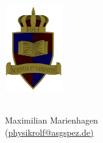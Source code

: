 \documentclass[a4paper, twocolumn]{article}
\title{
\centering\raisebox{-1cm}{
\parbox{4cm}{\texttt{[image: ROLF4]}}
\parbox{11cm}{\centering{\huge \textsf{Funktionen und Ableitungen}}\\Maximilian Marienhagen, Aaron Wild\\ (\href{mailto:physikrolf@asgspez.de}{physikrolf@asgspez.de)}}}\vspace{-3\baselineskip}} %
\date{}
\author{}
\begin{document}
\vspace*{-2cm}
\parbox{2cm}{\includegraphics[width=2.5cm]{../task/images/ROLF4.png}}
\parbox{5.3cm}{ \\ Maximilian Marienhagen\\ \vspace*{-0.5cm} (\href{mailto:physikrolf@asgspez.de}{physikrolf@asgspez.de)}}
\end{document}
